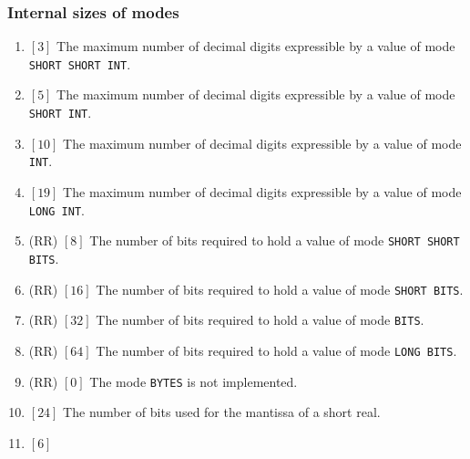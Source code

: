 \subsubsection*{Internal sizes of modes}
\begin{enumerate}
\item {} $[3]$
\newline
The maximum number of decimal digits expressible by a value of mode
\verb|SHORT SHORT INT|.
\item {} $[5]$ \newline
The maximum number of decimal digits expressible by a value of mode
\verb|SHORT INT|.

\item {} $[10]$
\newline
The maximum number of decimal digits expressible by a value of mode
\verb|INT|.
\item {} $[19]$ \newline
The maximum number of decimal digits expressible by a value of mode
\verb|LONG INT|.
\item {}
(RR) $[8]$ \newline
The number of bits required to hold a value of mode
\verb|SHORT SHORT BITS|.
\item {} (RR) $[16]$ \newline
The number of bits required to hold a value of mode \verb|SHORT BITS|.
\item {} (RR) $[32]$ \newline
The number of bits required to hold a value of mode \verb|BITS|.
\item {} (RR) $[64]$ \newline
The number of bits required to hold a value of mode \verb|LONG BITS|.
\item {}
(RR) $[0]$ \newline
The mode \verb|BYTES| is not implemented.
\item {} $[24]$
\newline
The number of bits used for the mantissa of a short real.
\item {} $[6]$ \newline

\end{enumerate}
